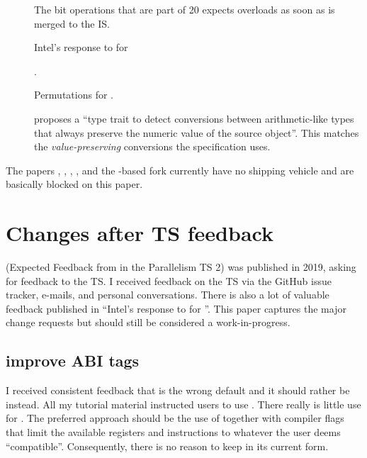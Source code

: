 \begin{description}
  \item[] The bit operations that are part of \CC{}20 expects  overloads as soon as  is merged to the IS.

  \item[] Intel’s response to  for 

  \item[] .

  \item[] Permutations for .

  \item[] \textcite{P2509R0} proposes a ``type trait to detect
    conversions between arithmetic-like types that always preserve the numeric
    value of the source object''. This matches the \textit{value-preserving}
    conversions the  specification uses.
\end{description}
The papers , , , , and
the -based  fork currently have no shipping vehicle
and are basically blocked on this paper.

\section{Changes after TS feedback}\label{sec:changes}
\cite{P1915R0} (Expected Feedback from  in the Parallelism TS 2) was published in 2019, asking for feedback to the TS.
I received feedback on the TS via the GitHub issue tracker, e-mails, and personal conversations.
There is also a lot of valuable feedback published in  ``Intel’s response to  for ''.
This paper captures the major change requests but should still be considered a work-in-progress.

\subsection{improve ABI tags}
I received consistent feedback that \simdabi{} is the wrong default and it should rather be \simdabi{} instead.
All my tutorial material instructed users to use \stdx{}.
There really is little use for \simdabi{}.
The preferred approach should be the use of \simdabi{} together with compiler flags that limit the available registers and instructions to whatever the user deems “compatible”.
Consequently, there is no reason to keep \simdabi{} in its current form.

